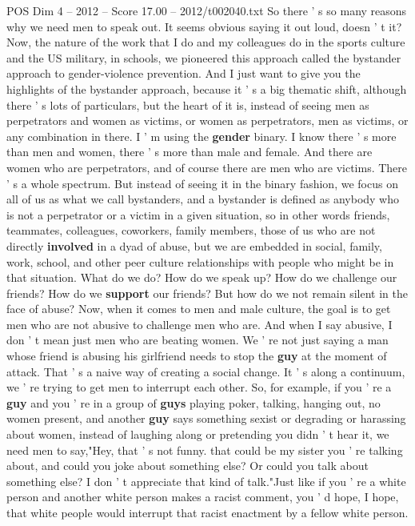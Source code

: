 \begin{textsample}{POS Dim 4 – 2012 – Score 17.00 – 2012/t002040.txt}
So there ' s so many reasons why we need men to speak out.
It seems obvious saying it out loud, doesn ' t it?
Now, the nature of the work that I do and my colleagues do in the sports culture and the US military, in schools, we pioneered this approach called the bystander approach to gender-violence prevention.
And I just want to give you the highlights of the bystander approach, because it ' s a big thematic shift, although there ' s lots of particulars, but the heart of it is, instead of seeing men as perpetrators and women as victims, or women as perpetrators, men as victims, or any combination in there.
I ' m using the \textbf{gender} binary.
I know there ' s more than men and women, there ' s more than male and female.
And there are women who are perpetrators, and of course there are men who are victims.
There ' s a whole spectrum.
But instead of seeing it in the binary fashion, we focus on all of us as what we call bystanders, and a bystander is defined as anybody who is not a perpetrator or a victim in a given situation, so in other words friends, teammates, colleagues, coworkers, family members, those of us who are not directly \textbf{involved} in a dyad of abuse, but we are embedded in social, family, work, school, and other peer culture relationships with people who might be in that situation.
What do we do?
How do we speak up?
How do we challenge our friends?
How do we \textbf{support} our friends?
But how do we not remain silent in the face of abuse?
Now, when it comes to men and male culture, the goal is to get men who are not abusive to challenge men who are.
And when I say abusive, I don ' t mean just men who are beating women.
We ' re not just saying a man whose friend is abusing his girlfriend needs to stop the \textbf{guy} at the moment of attack.
That ' s a naive way of creating a social change.
It ' s along a continuum, we ' re trying to get men to interrupt each other.
So, for example, if you ' re a \textbf{guy} and you ' re in a group of \textbf{guys} playing poker, talking, hanging out, no women present, and another \textbf{guy} says something sexist or degrading or harassing about women, instead of laughing along or pretending you didn ' t hear it, we need men to say,"Hey, that ' s not funny. that could be my sister you ' re talking about, and could you joke about something else?
Or could you talk about something else?
I don ' t appreciate that kind of talk."Just like if you ' re a white person and another white person makes a racist comment, you ' d hope, I hope, that white people would interrupt that racist enactment by a fellow white person.

\end{textsample}
